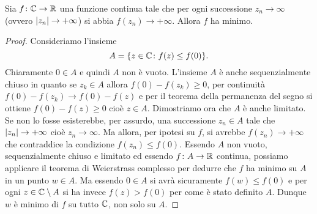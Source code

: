 \begin{theorem}
Sia $f\colon {\mathbb C} \to {\mathbb R}$ una funzione continua tale che per ogni
successione $z_n \to \infty$ (ovvero ${\left|z_n\right|}\to +\infty$)
si abbia $f(z_n) \to +\infty$.
Allora $f$ ha minimo.
\end{theorem}
%
\begin{proof}
Consideriamo l'insieme
\[
  A = {\left\{ z \in {\mathbb C} \colon f(z) \le f(0) \right\}}.
\]
Chiaramente $0\in A$ e quindi $A$ non è vuoto.
L'insieme $A$ è anche sequenzialmente chiuso in quanto se $z_k\in A$ allora $f(0) - f(z_k)\ge 0$,
per continuità $f(0)-f(z_k)\to f(0)-f(z)$
e per il teorema della permanenza del segno si ottiene $f(0)-f(z) \ge 0$ cioè $z \in A$.
Dimostriamo ora che $A$ è anche limitato. 
Se non lo fosse esisterebbe, per assurdo, una successione $z_n \in A$ tale che ${\left|z_n\right|}\to +\infty$ cioè $z_n \to \infty$. 
Ma allora, per ipotesi su $f$, si avrebbe $f(z_n)\to +\infty$ che contraddice la condizione $f(z_n) \le f(0)$. 
Essendo $A$ non vuoto, sequenzialmente chiuso e limitato ed essendo $f\colon A \to {\mathbb R}$ continua, 
possiamo applicare il teorema di Weierstrass complesso per dedurre che $f$ ha minimo su $A$ in un punto $w \in A$. 
Ma essendo $0\in A$ si avrà sicuramente $f(w)\le f(0)$ e per ogni $z\in {\mathbb C} \setminus A$ si ha invece $f(z) > f(0)$ per come è stato definito $A$. 
Dunque $w$ è minimo di $f$ su tutto ${\mathbb C}$, non solo su $A$.
\end{proof}

